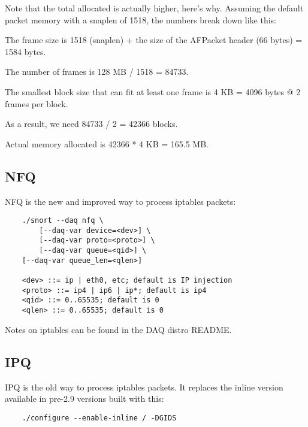 \documentclass[english]{report}
\newcounter{slistnum}
\newenvironment{slist}
{ \begin{list}{ {\bf \arabic{slistnum}.} }{\usecounter{slistnum} } }
{ \end{list} }
\begin{document}
Note that the total allocated is actually higher, here's why.  Assuming the
default packet memory with a snaplen of 1518, the numbers break down like this:

\begin{slist}
\item
The frame size is 1518 (snaplen) + the size of the AFPacket header (66
bytes) = 1584 bytes.

\item
The number of frames is 128 MB / 1518 = 84733.

\item
The smallest block size that can fit at least one frame is  4 KB = 4096 bytes
  @ 2 frames per block.

\item
As a result, we need 84733 / 2 = 42366 blocks.

\item
Actual memory allocated is 42366 * 4 KB = 165.5 MB.
\end{slist}

\subsection{NFQ}

NFQ is the new and improved way to process iptables packets:

\begin{verbatim}
    ./snort --daq nfq \
        [--daq-var device=<dev>] \
        [--daq-var proto=<proto>] \
        [--daq-var queue=<qid>] \
	[--daq-var queue_len=<qlen>]

    <dev> ::= ip | eth0, etc; default is IP injection
    <proto> ::= ip4 | ip6 | ip*; default is ip4
    <qid> ::= 0..65535; default is 0
    <qlen> ::= 0..65535; default is 0
\end{verbatim}

Notes on iptables can be found in the DAQ distro README.

\subsection{IPQ}

IPQ is the old way to process iptables packets.  It replaces the inline version
available in pre-2.9 versions built with this:

\begin{verbatim}
    ./configure --enable-inline / -DGIDS
\end{verbatim}
\end{document}
